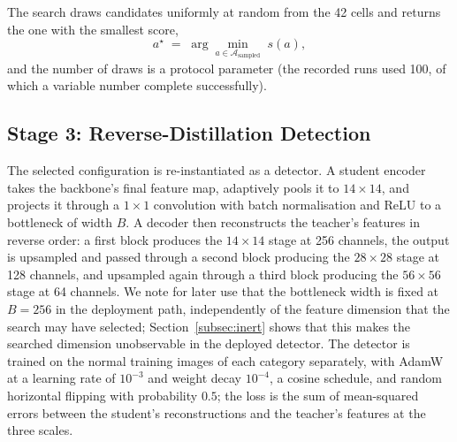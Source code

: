 The search draws candidates uniformly at random from the 42 cells and returns the
one with the smallest score,
%
\begin{equation}
\label{eq:argmin}
a^\star \;=\; \arg\min_{a \in \mathcal{A}_{\text{sampled}}} \; s(a),
\end{equation}
%
and the number of draws is a protocol parameter (the recorded runs used 100, of
which a variable number complete successfully).

\subsection{Stage 3: Reverse-Distillation Detection}
\label{subsec:rd_detection}

The selected configuration is re-instantiated as a detector. A student encoder
takes the backbone's final feature map, adaptively pools it to $14\times14$, and
projects it through a $1\times1$ convolution with batch normalisation and ReLU to
a bottleneck of width $B$. A decoder then reconstructs the teacher's features in
reverse order: a first block produces the $14\times14$ stage at 256 channels, the
output is upsampled and passed through a second block producing the $28\times28$
stage at 128 channels, and upsampled again through a third block producing the
$56\times56$ stage at 64 channels. We note for later use that the bottleneck width
is fixed at $B = 256$ in the deployment path, independently of the feature
dimension that the search may have selected;
Section~\ref{subsec:inert} shows that this makes the searched dimension
unobservable in the deployed detector. The detector is trained on the normal
training images of each category separately, with AdamW at a learning rate of
$10^{-3}$ and weight decay $10^{-4}$, a cosine schedule, and random horizontal
flipping with probability $0.5$; the loss is the sum of mean-squared errors
between the student's reconstructions and the teacher's features at the three
scales.


